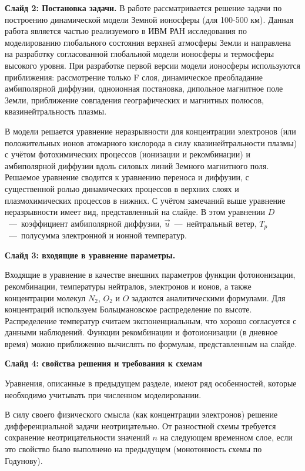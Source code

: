 \documentclass[2pt, a4paper, fleqn]{extarticle}
\begin{document}
{\bf Слайд 2: Постановка задачи.}
В работе рассматривается решение задачи по построению динамической модели Земной ионосферы (для 100-500 км). Данная работа является частью реализуемого  в ИВМ РАН исследования по моделированию глобального состояния верхней атмосферы Земли и направлена на разработку согласованной глобальной модели ионосферы и термосферы высокого уровня. При разработке первой версии модели ионосферы используются приближения: рассмотрение только F слоя, динамическое преобладание амбиполярной диффузии, одноионная постановка, дипольное магнитное поле Земли, приближение совпадения географических и магнитных полюсов, квазинейтральность плазмы.

В модели решается уравнение неразрывности для концентрации электронов (или положительных ионов атомарного кислорода в силу квазинейтральности плазмы) с учётом фотохимических процессов (ионизации и рекомбинации) и амбиполярной диффузии вдоль силовых линий Земного магнитного поля. Решаемое уравнение сводится к уравнению переноса и диффузии, с существенной ролью динамических процессов в верхних слоях и плазмохимических процессов в нижних. С учётом замечаний выше уравнение неразрывности имеет вид, представленный на слайде. В этом уравнении $D$~---~коэффициент амбиполярной диффузии, $\vec{u}$~---~нейтральный ветер, $T_p$~---~полусумма электронной и ионной температур.

\medskip

{\bf Слайд 3: входящие в уравнение параметры.}

Входящие в уравнение в качестве внешних параметров функции фотоионизации, рекомбинации, температуры нейтралов, электронов и ионов, а также концентрации молекул $N_2$, $O_2$ и $O$ задаются аналитическими формулами. Для концентраций используем Больцмановское распределение по высоте. Распределение температур считаем экспоненциальным, что хорошо согласуется с данными наблюдений. 
Функции рекомбинации и фотоионизации (в дневное время) можно приближенно вычислять по формулам, представленным на слайде.


\medskip

{\bf Слайд 4: свойства решения и требования к схемам}

Уравнения, описанные в предыдущем разделе, имеют ряд особенностей, которые необходимо учитывать при численном моделировании.

В силу своего физического смысла (как концентрации электронов) решение дифференциальной задачи неотрицательно. От разностной схемы требуется сохранение неотрицательности значений $n$ на следующем временном слое, если это свойство было выполнено на предыдущем (монотонность схемы по Годунову). 
\end{document}
